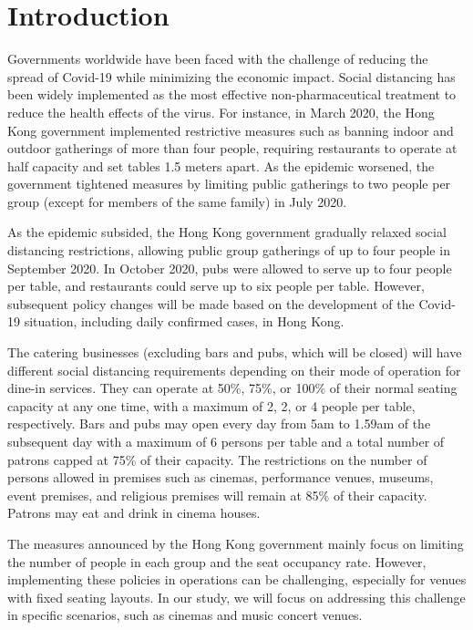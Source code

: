 \section{Introduction}

Governments worldwide have been faced with the challenge of reducing the spread of Covid-19 while minimizing the economic impact. Social distancing has been widely implemented as the most effective non-pharmaceutical treatment to reduce the health effects of the virus. For instance, in March 2020, the Hong Kong government implemented restrictive measures such as banning indoor and outdoor gatherings of more than four people, requiring restaurants to operate at half capacity and set tables 1.5 meters apart. As the epidemic worsened, the government tightened measures by limiting public gatherings to two people per group (except for members of the same family) in July 2020.

As the epidemic subsided, the Hong Kong government gradually relaxed social distancing restrictions, allowing public group gatherings of up to four people in September 2020. In October 2020, pubs were allowed to serve up to four people per table, and restaurants could serve up to six people per table. However, subsequent policy changes will be made based on the development of the Covid-19 situation, including daily confirmed cases, in Hong Kong.


The catering businesses (excluding bars and pubs, which will be closed) will have different social distancing requirements depending on their mode of operation for dine-in services. They can operate at 50\%, 75\%, or 100\% of their normal seating capacity at any one time, with a maximum of 2, 2, or 4 people per table, respectively. Bars and pubs may open every day from 5am to 1.59am of the subsequent day with a maximum of 6 persons per table and a total number of patrons capped at 75\% of their capacity. The restrictions on the number of persons allowed in premises such as cinemas, performance venues, museums, event premises, and religious premises will remain at 85\% of their capacity. Patrons may eat and drink in cinema houses. 

The measures announced by the Hong Kong government mainly focus on limiting the number of people in each group and the seat occupancy rate. However, implementing these policies in operations can be challenging, especially for venues with fixed seating layouts. In our study, we will focus on addressing this challenge in specific scenarios, such as cinemas and music concert venues. 

